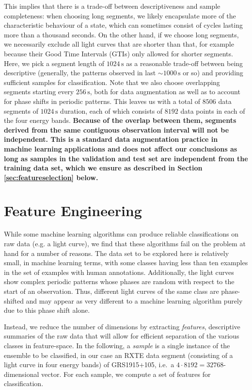 \documentclass[fleqn,usenatbib]{mnras}
\begin{document}
This implies that there is a trade-off between descriptiveness and sample completeness: when choosing long segments, we likely encapsulate more of the characteristic behaviour of a state, which can sometimes consist of cycles lasting more than a thousand seconds. On the other hand, if we choose long segments, we necessarily exclude all light curves that are shorter than that, for example because their Good Time Intervals (GTIs) only allowed for shorter segments. Here, we pick a segment length of $1024\,\mathrm{s}$ as a reasonable trade-off between being descriptive (generally, the patterns observed in \citet{belloni2000} last $\sim\!1000\,\mathrm{s}$ or so) and providing sufficient samples for classification. Note that we also choose overlapping segments starting every $256\,\mathrm{s}$, both for data augmentation as well as to account for phase shifts in periodic patterns. This leaves us with a total of $8506$ data segments of $1024\,\mathrm{s}$ duration, each of which consists of $8192$ data points in each of the four energy bands. \textbf{Because of the overlap between them, segments derived from the same contiguous observation interval will not be independent. This is a standard data augmentation practice in machine learning applications and does not affect our conclusions as long as samples in the validation and test set are independent from the training data set, which we ensure as described in Section \ref{sec:featureselection} below.}

\section{Feature Engineering}
\label{sec:featureengineering}

While some machine learning algorithms can produce reliable classifications on raw data (e.g. a light curve), we find that these algorithms fail on the problem at hand for a number of reasons. The data set to be explored here is relatively small, in machine learning terms, with some classes having less than ten examples in the set of examples with human annotations. Additionally, the light curves show complex periodic patterns whose phases are random with respect to the start of an observation. Thus, different light curves of the same class are phase-shifted and may appear as very different to a machine learning algorithm purely due to this phase shift alone.

Instead, we reduce the number of dimensions by extracting \textit{features}, descriptive summaries of the raw data that will allow for efficient separation of the various classes in feature-space.
In the following, a \textit{sample} is a single instance of the ensemble to be classified, in our case an RXTE data segment (consisting of a light curve in four energy bands) of GRS1915+105, i.e.\ a $4 \cdot 8192 = 32768$-dimensional vector. For each sample, we compute a set of features for classification. 
\end{document}
